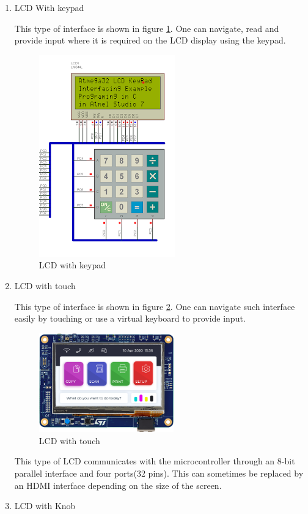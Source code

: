 \begin{enumerate}
    \item LCD With keypad 
    \par
    This type of interface is shown in figure \ref{fig:lcd_with keypad}. One can navigate, read and provide input where it is required on the LCD display using the keypad.
    \begin{figure}[H]
        \centering
        \includegraphics[width=.25\textwidth,height=.25\textheight]{Figures/controlInterface.png}
        \caption[LCD with keypad]{LCD with keypad \cite{lcd_with_keypad}}
        \label{fig:lcd_with keypad}
    \end{figure}
    \item LCD with touch 
    \par
    This type of interface is shown in figure \ref{fig:lcd_with_touch}. One can navigate such interface easily by touching or use a virtual keyboard to provide input. 
    \begin{figure}[H]
        \centering
        \includegraphics[width=0.55\textwidth,height=.35\textheight]{Figures/lcdWithTouch.png}
        \caption[LCD with touch]{LCD with touch \cite{lcd_with_touch}}
        \label{fig:lcd_with_touch}
    \end{figure}
     This type of LCD communicates with the microcontroller through an 8-bit parallel interface and four ports(32 pins). This can sometimes be replaced by an HDMI interface depending on the size of the screen.
    \item LCD with Knob

\end{enumerate}
